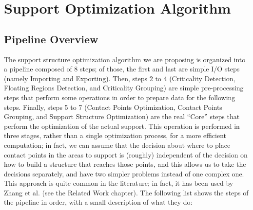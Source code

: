 \chapter{Support Optimization Algorithm}
\label{cha:support_opt_alg}


\section{Pipeline Overview}
\label{sec:pipeline_overview}

The support structure optimization algorithm we are proposing is organized into a pipeline
composed of 8 steps; of those, the first and last are simple I/O steps (namely Importing and Exporting).
Then, steps 2 to 4 (Criticality Detection, Floating Regions Detection, and Criticality Grouping)
are simple pre-processing steps that perform some operations in order to prepare data for the following
steps.
Finally, steps 5 to 7 (Contact Points Optimization, Contact Points Grouping, and Support
Structure Optimization) are the real ``Core'' steps that perform the optimization
of the actual support. This operation is performed in three stages, rather than a single optimization 
process, for a more efficient computation; in fact, we can assume that the decision about where to place
contact points in the areas to support is (roughly) independent of the decision on how to build a
structure that reaches those points, and this allows us to take the decisions separately, and have two simpler
problems instead of one complex one. This approach is quite common in the literature; in fact, it has
been used by Zhang et al. \cite{ZHANG2020117} (see the Related Work chapter).
The following list shows the steps of the pipeline in order, with a small description of what they do:

